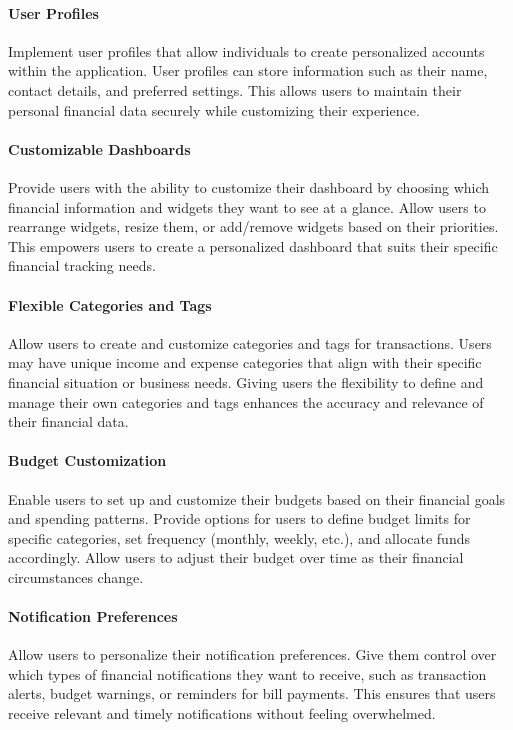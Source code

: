 \paragraph{User Profiles}
Implement user profiles that allow individuals to create personalized accounts within the application. User 
profiles can store information such as their name, contact details, and preferred settings. This allows users 
to maintain their personal financial data securely while customizing their experience.

\paragraph{Customizable Dashboards}
Provide users with the ability to customize their dashboard by choosing which financial information and widgets they 
want to see at a glance. Allow users to rearrange widgets, resize them, or add/remove widgets based on their 
priorities. This empowers users to create a personalized dashboard that suits their specific financial tracking needs.

\paragraph{Flexible Categories and Tags}
Allow users to create and customize categories and tags for transactions. Users may have unique income and expense 
categories that align with their specific financial situation or business needs. Giving users the flexibility to 
define and manage their own categories and tags enhances the accuracy and relevance of their financial data.

\paragraph{Budget Customization}
Enable users to set up and customize their budgets based on their financial goals and spending patterns. Provide 
options for users to define budget limits for specific categories, set frequency (monthly, weekly, etc.), and 
allocate funds accordingly. Allow users to adjust their budget over time as their financial circumstances change.

\paragraph{Notification Preferences}
Allow users to personalize their notification preferences. Give them control over which types of financial 
notifications they want to receive, such as transaction alerts, budget warnings, or reminders for bill payments. 
This ensures that users receive relevant and timely notifications without feeling overwhelmed.

